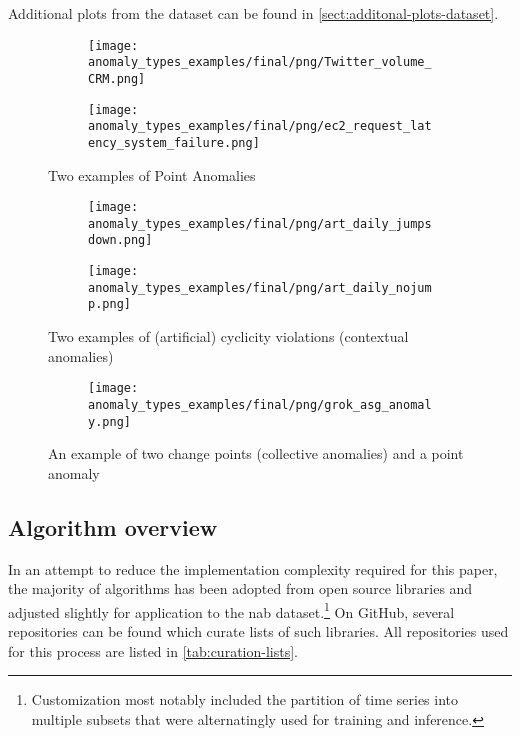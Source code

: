 Additional plots from the dataset can be found in \cref{sect:additonal-plots-dataset}.

\begin{figure}[htp!]
    \centering
    \begin{subfigure}[t]{.49\linewidth}
        \centering
        \texttt{[image: anomaly\_types\_examples/final/png/Twitter\_volume\_CRM.png]}
    \end{subfigure}
    \begin{subfigure}[t]{.49\linewidth}
        \centering
        \texttt{[image: anomaly\_types\_examples/final/png/ec2\_request\_latency\_system\_failure.png]}
    \end{subfigure}
    \caption{Two examples of Point Anomalies}\label{fig:point-anomalies-nab}
\end{figure}

\begin{figure}[htp!]
    \centering
    \begin{subfigure}[t]{.49\linewidth}
        \centering
        \texttt{[image: anomaly\_types\_examples/final/png/art\_daily\_jumpsdown.png]}
    \end{subfigure}
    \begin{subfigure}[t]{.49\linewidth}
        \centering
        \texttt{[image: anomaly\_types\_examples/final/png/art\_daily\_nojump.png]}
    \end{subfigure}
    \caption{Two examples of (artificial) cyclicity violations (contextual anomalies)}\label{fig:contextual-anomalies-nab}
\end{figure}

\begin{figure}[htp!]
    \centering
    \begin{subfigure}[t]{.49\linewidth}
        \centering
        \texttt{[image: anomaly\_types\_examples/final/png/grok\_asg\_anomaly.png]}
    \end{subfigure}
    \caption{An example of two change points (collective anomalies) and a point anomaly}\label{fig:collective-anomalies-nab}
\end{figure}
\clearpage

\subsection{Algorithm overview}
In an attempt to reduce the implementation complexity required for this paper,
the majority of algorithms has been adopted from open source libraries and
adjusted slightly for application to the \gls{nab} dataset.\footnote{Customization most notably
included the partition of time series into multiple subsets that were alternatingly
used for training and inference.} On GitHub, several repositories can be found
which curate lists of such libraries. All repositories used for this process are
listed in \cref{tab:curation-lists}.


